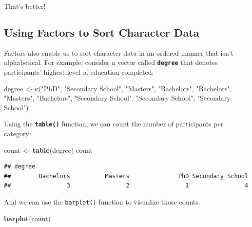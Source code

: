 \documentclass[
]{book}
\newenvironment{Shaded}{\begin{snugshade}}{\end{snugshade}}
\newcommand{\FunctionTok}[1]{\textcolor[rgb]{0.13,0.29,0.53}{\textbf{#1}}}
\newcommand{\NormalTok}[1]{#1}
\newcommand{\OtherTok}[1]{\textcolor[rgb]{0.56,0.35,0.01}{#1}}
\newcommand{\StringTok}[1]{\textcolor[rgb]{0.31,0.60,0.02}{#1}}
\begin{document}
That's better!

\hypertarget{using-factors-to-sort-character-data}{%
\subsection{Using Factors to Sort Character Data}\label{using-factors-to-sort-character-data}}

Factors also enable us to sort character data in an ordered manner that isn't alphabetical. For example, consider a vector called \textbf{\texttt{degree}} that denotes participants' highest level of education completed:

\begin{Shaded}
\begin{Highlighting}[]
\NormalTok{degree }\OtherTok{\textless{}{-}} \FunctionTok{c}\NormalTok{(}\StringTok{"PhD"}\NormalTok{, }\StringTok{"Secondary School"}\NormalTok{, }\StringTok{"Masters"}\NormalTok{, }\StringTok{"Bachelors"}\NormalTok{, }\StringTok{"Bachelors"}\NormalTok{, }\StringTok{"Masters"}\NormalTok{, }\StringTok{"Bachelors"}\NormalTok{, }\StringTok{"Secondary School"}\NormalTok{, }\StringTok{"Secondary School"}\NormalTok{, }\StringTok{"Secondary School"}\NormalTok{)}
\end{Highlighting}
\end{Shaded}

Using the \textbf{\texttt{table()}} function, we can count the number of participants per category:

\begin{Shaded}
\begin{Highlighting}[]
\NormalTok{count }\OtherTok{\textless{}{-}} \FunctionTok{table}\NormalTok{(degree)}
\NormalTok{count}
\end{Highlighting}
\end{Shaded}

\begin{verbatim}
## degree
##        Bachelors          Masters              PhD Secondary School 
##                3                2                1                4
\end{verbatim}

And we can use the \texttt{barplot()} function to visualize those counts.

\begin{Shaded}
\begin{Highlighting}[]
\FunctionTok{barplot}\NormalTok{(count)}
\end{Highlighting}
\end{Shaded}
\end{document}
